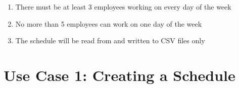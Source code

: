 \documentclass[12pt]{article}
\begin{document}
\begin{enumerate}

\item
There must be at least 3 employees working on every day of the week

\item
No more than 5 employees can work on one day of the week

\item
The schedule will be read from and written to CSV files only

\end{enumerate}

\section*{ Use Case 1: Creating a Schedule}
\end{document}

